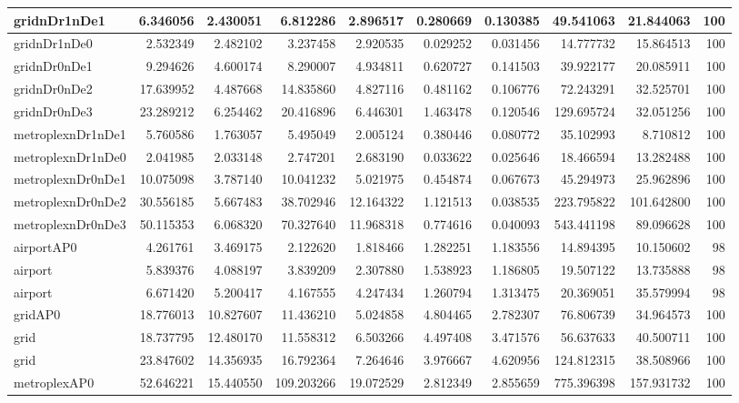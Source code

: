 \begin{longtable}{|l|r|r|r|r|r|r|r|r|r|}
gridnDr1nDe1 & 6.346056 & 2.430051 & 6.812286 & 2.896517 & 0.280669 & 0.130385 & 49.541063 & 21.844063 & 100 \\ \hline
gridnDr1nDe0 & 2.532349 & 2.482102 & 3.237458 & 2.920535 & 0.029252 & 0.031456 & 14.777732 & 15.864513 & 100 \\ \hline
gridnDr0nDe1 & 9.294626 & 4.600174 & 8.290007 & 4.934811 & 0.620727 & 0.141503 & 39.922177 & 20.085911 & 100 \\ \hline
gridnDr0nDe2 & 17.639952 & 4.487668 & 14.835860 & 4.827116 & 0.481162 & 0.106776 & 72.243291 & 32.525701 & 100 \\ \hline
gridnDr0nDe3 & 23.289212 & 6.254462 & 20.416896 & 6.446301 & 1.463478 & 0.120546 & 129.695724 & 32.051256 & 100 \\ \hline
metroplexnDr1nDe1 & 5.760586 & 1.763057 & 5.495049 & 2.005124 & 0.380446 & 0.080772 & 35.102993 & 8.710812 & 100 \\ \hline
metroplexnDr1nDe0 & 2.041985 & 2.033148 & 2.747201 & 2.683190 & 0.033622 & 0.025646 & 18.466594 & 13.282488 & 100 \\ \hline
metroplexnDr0nDe1 & 10.075098 & 3.787140 & 10.041232 & 5.021975 & 0.454874 & 0.067673 & 45.294973 & 25.962896 & 100 \\ \hline
metroplexnDr0nDe2 & 30.556185 & 5.667483 & 38.702946 & 12.164322 & 1.121513 & 0.038535 & 223.795822 & 101.642800 & 100 \\ \hline
metroplexnDr0nDe3 & 50.115353 & 6.068320 & 70.327640 & 11.968318 & 0.774616 & 0.040093 & 543.441198 & 89.096628 & 100 \\ \hline
airportAP0 & 4.261761 & 3.469175 & 2.122620 & 1.818466 & 1.282251 & 1.183556 & 14.894395 & 10.150602 & 98 \\ \hline
airport & 5.839376 & 4.088197 & 3.839209 & 2.307880 & 1.538923 & 1.186805 & 19.507122 & 13.735888 & 98 \\ \hline
airport & 6.671420 & 5.200417 & 4.167555 & 4.247434 & 1.260794 & 1.313475 & 20.369051 & 35.579994 & 98 \\ \hline
gridAP0 & 18.776013 & 10.827607 & 11.436210 & 5.024858 & 4.804465 & 2.782307 & 76.806739 & 34.964573 & 100 \\ \hline
grid & 18.737795 & 12.480170 & 11.558312 & 6.503266 & 4.497408 & 3.471576 & 56.637633 & 40.500711 & 100 \\ \hline
grid & 23.847602 & 14.356935 & 16.792364 & 7.264646 & 3.976667 & 4.620956 & 124.812315 & 38.508966 & 100 \\ \hline
metroplexAP0 & 52.646221 & 15.440550 & 109.203266 & 19.072529 & 2.812349 & 2.855659 & 775.396398 & 157.931732 & 100 \\ \hline

\end{longtable}
